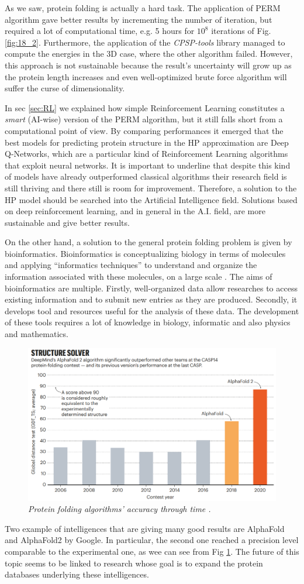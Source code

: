 As we saw, protein folding is actually a hard task.
The application of PERM algorithm gave better results by incrementing the number of iteration, but required a lot of computational time, e.g. 5 hours for $10^8$ iterations of Fig. \ref{fig:18_2}.
Furthermore, the application of the \emph{CPSP-tools} library managed to compute the energies in the 3D case, where the other algorithm failed.
However, this approach is not sustainable because the result's uncertainty will grow up as the protein length increases and even well-optimized brute force algorithm will suffer the curse of dimensionality.

In sec \ref{sec:RL} we explained how simple Reinforcement Learning  constitutes a \emph{smart} (AI-wise) version of the PERM algorithm, but it still falls short from a computational point of view.
By comparing performances it emerged that the best models for predicting protein structure in the HP approximation are Deep Q-Networks, which are a particular kind of Reinforcement Learning algorithms that exploit neural networks.
It is important to underline that despite this kind of models have already outperformed classical algorithms their research field is still thriving and there still is room for improvement.
Therefore, a solution to the HP model should be searched into the Artificial Intelligence field.
Solutions based on deep reinforcement learning, and in general in the A.I. field, are more sustainable and give better results.

On the other hand, a solution to the general protein folding problem is given by bioinformatics.
Bioinformatics is conceptualizing biology in terms of molecules and applying ``informatics techniques'' to understand and organize the information associated with these molecules, on a large scale \cite{bioinfo}.
The aims of bioinformatics are multiple.
Firstly, well-organized data allow researches to access existing information and to submit new entries as they are produced.
Secondly, it develops tool and resources useful for the analysis of these data.
The development of these tools requires a lot of knowledge in biology, informatic and also physics and mathematics.
\begin{figure}[H]
    \centering
    \includegraphics[width=.6\textwidth]{./img/alphafold.png}
    \caption{\emph{Protein folding algorithms' accuracy through time \cite{alphafold}.}}
    \label{fig:alphafold}
\end{figure}
Two example of intelligences that are giving many good results are AlphaFold and AlphaFold2 by Google.
In particular, the second one reached a precision level comparable to the experimental one, as wee can see from Fig \ref{fig:alphafold}.
The future of this topic seems to be linked to research whose goal is to expand the protein databases underlying these intelligences.
